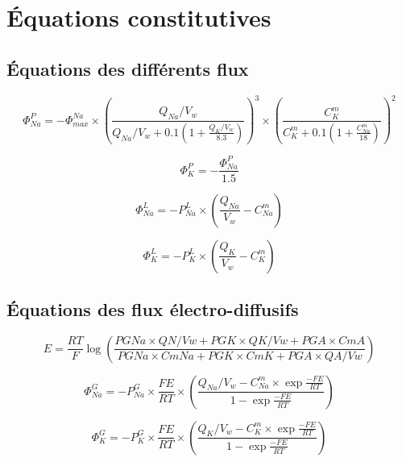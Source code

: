 \documentclass[a4paper,fleqn]{article}
\begin{document}
\section{Équations constitutives}

\subsection{Équations des différents flux}

\begin{equation}
\Phi_{Na}^{P}={-\Phi_{max}^{Na}}\times{\left(\frac{Q_{Na}/V_w}{Q_{Na}/V_w+0.1\left(1+\frac{Q_{K}/V_w}{8.3}\right)}\right)^3}\times{\left(\frac{C_{K}^{m}}{C_{K}^{m}+0.1\left(1+\frac{C_{Na}^{m}}{18}\right)}\right)^2}
\end{equation}

\begin{equation}
\Phi_{K}^{P}=-\frac{\Phi_{Na}^{P}}{1.5}
\end{equation}

\begin{equation}
\Phi_{Na}^{L}={-P_{Na}^{L}}\times{\left(\frac{Q_{Na}}{V_w}-C_{Na}^{m}\right)}
\end{equation}

\begin{equation}
\Phi_{K}^{L}={-P_{K}^{L}}\times{\left(\frac{Q_{K}}{V_w}-C_{K}^{m}\right)}
\end{equation}

\subsection{Équations des flux électro-diffusifs}

\begin{equation}
E =  \frac{RT}{F}\log{\left(\frac{{PGNa}\times{QN}/Vw + {PGK}\times{QK/Vw} + {PGA}\times{CmA}}{{PGNa}\times{CmNa} + {PGK}\times{CmK} + {PGA}\times{QA/Vw}}\right)}
\end{equation}

\begin{equation}
\Phi_{Na}^{G}={-P_{Na}^{G}}\times{\frac{FE}{RT}}\times{\left(\frac{Q_{Na}/V_w-{C_{Na}^{m}}\times{\exp{\frac{-FE}{RT}}}}{1 - \exp{\frac{-FE}{RT}}}\right)}
\end{equation}

\begin{equation}
\Phi_{K}^{G}={-P_{K}^{G}}\times{\frac{FE}{RT}}\times{\left(\frac{Q_{K}/V_w-{C_{K}^{m}}\times{\exp{\frac{-FE}{RT}}}}{1 - \exp{\frac{-FE}{RT}}}\right)}
\end{equation}
\end{document}
